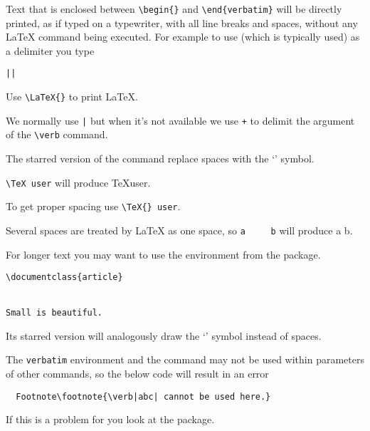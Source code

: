 Text that is enclosed between \verb|\begin{|\verb|}| and
\verb|\end{verbatim}| will be directly printed, as if typed on a typewriter,
with all line breaks and spaces, without any \LaTeX{} command being executed.
For example to use \cargv{|} (which is typically used) as a delimiter you type
\begin{lscommand}
  \verb+|+\verb+|+
\end{lscommand}

\begin{example}
Use \verb|\LaTeX{}| to 
print \LaTeX.

We normally use \verb+|+ but
when it's not available we
use \verb|+| to delimit the
argument of the \verb|\verb|
command.
\end{example}

The starred version of the  command replace spaces with the
\enquote*{\textvisiblespace{}} symbol.

\begin{chktexignore}
\begin{example}
\verb*|\TeX user| will
produce \TeX user.

To get proper spacing use
\verb*|\TeX{} user|.

Several spaces are treated
by \LaTeX{} as one space, 
so \verb*|a     b| will
produce a     b.
\end{example}
\end{chktexignore}

For longer text you may want to use the  environment from the
 package.
\begin{example}
\begin{verbatim}
\documentclass{article}


Small is beautiful.

\end{verbatim}
\end{example}
Its starred version will analogously draw the \enquote*{\textvisiblespace}
symbol instead of spaces.

The \texttt{verbatim} environment and the  command may not be used
within parameters of other commands, so the below code will result in an error
\begin{verbatim}
  Footnote\footnote{\verb|abc| cannot be used here.}
\end{verbatim}
If this is a problem for you look at the  package.

